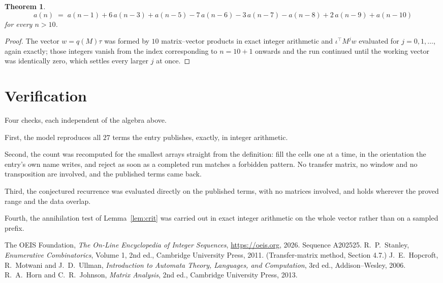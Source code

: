 \documentclass[11pt,a4paper]{article}
\theoremstyle{plain}
\newtheorem{theorem}{Theorem}
\theoremstyle{definition}
\begin{document}
\begin{theorem}
\[
a(n)\;=\;a(n-1) + 6\,a(n-3) + a(n-5) - 7\,a(n-6) - 3\,a(n-7) - a(n-8) + 2\,a(n-9) + a(n-10)
\]
for every $n>10$.
\end{theorem}

\begin{proof}
The vector $w=q(M)\tau$ was formed by $10$ matrix--vector products in exact integer
arithmetic and $\iota^{\!\top}M^{j}w$ evaluated for $j=0,1,\dots$, again exactly; those
integers vanish from the index corresponding to $n=10+1$ onwards and the run continued
until the working vector was identically zero, which settles every larger $j$ at once.
\end{proof}

\section{Verification}

Four checks, each independent of the algebra above.

First, the model reproduces all $27$ terms the entry publishes, exactly, in integer
arithmetic.

Second, the count was recomputed for the smallest arrays straight from the definition: fill the
cells one at a time, in the orientation the entry's own name writes, and reject as soon as a
completed run matches a forbidden pattern. No transfer matrix, no window and no transposition
are involved, and the published terms came back.

Third, the conjectured recurrence was evaluated directly on the published terms, with no
matrices involved, and holds wherever the proved range and the data overlap.

Fourth, the annihilation test of Lemma~\ref{lem:crit} was carried out in exact integer
arithmetic on the whole vector rather than on a sampled prefix.

\begin{thebibliography}{9}
 The OEIS Foundation, \emph{The On-Line Encyclopedia of Integer
Sequences}, \url{https://oeis.org}, 2026. Sequence A202525.
 R.~P.~Stanley, \emph{Enumerative Combinatorics}, Volume 1, 2nd ed.,
Cambridge University Press, 2011. (Transfer-matrix method, Section 4.7.)
 J.~E.~Hopcroft, R.~Motwani and J.~D.~Ullman, \emph{Introduction to Automata
Theory, Languages, and Computation}, 3rd ed., Addison--Wesley, 2006.
 R.~A.~Horn and C.~R.~Johnson, \emph{Matrix Analysis}, 2nd ed., Cambridge
University Press, 2013.
\end{thebibliography}
\end{document}
